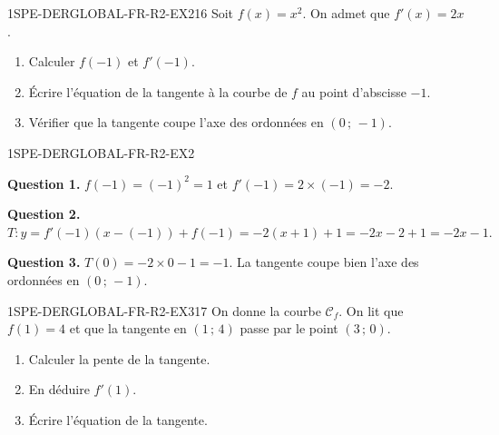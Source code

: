
\begin{exercice}{1SPE-DERGLOBAL-FR-R2-EX2}{1}{6}
Soit $f(x) = x^2$. On admet que $f'(x) = 2x$.
\begin{enumerate}
  \item Calculer $f(-1)$ et $f'(-1)$.
  \item Écrire l'équation de la tangente à la courbe de $f$ au point d'abscisse $-1$.
  \item Vérifier que la tangente coupe l'axe des ordonnées en $(0\,;\,-1)$.
\end{enumerate}
\end{exercice}


\begin{corrige}{1SPE-DERGLOBAL-FR-R2-EX2}

\textbf{Question 1.}
$f(-1) = (-1)^2 = 1$ et $f'(-1) = 2 \times (-1) = -2$.

\textbf{Question 2.}
$T : y = f'(-1)(x - (-1)) + f(-1) = -2(x + 1) + 1 = -2x - 2 + 1 = -2x - 1.$

\textbf{Question 3.}
$T(0) = -2 \times 0 - 1 = -1.$ La tangente coupe bien l'axe des ordonnées en $(0\,;\,-1)$. \checkmark

\end{corrige}


\begin{exercice}{1SPE-DERGLOBAL-FR-R2-EX3}{1}{7}
On donne la courbe $\mathcal{C}_f$. On lit que $f(1) = 4$ et que la tangente en $(1\,;\,4)$ passe par le point $(3\,;\,0)$.
\begin{enumerate}
  \item Calculer la pente de la tangente.
  \item En déduire $f'(1)$.
  \item Écrire l'équation de la tangente.
\end{enumerate}
\end{exercice}


